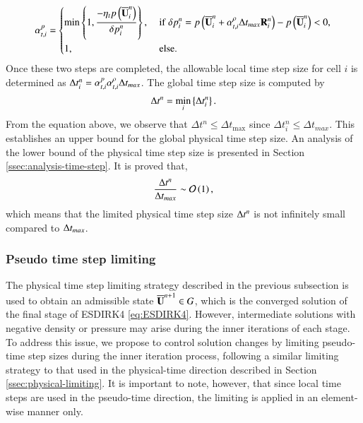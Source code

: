 \begin{equation}
\label{eq:alpha-t-p}
    \alpha_{t,i}^{p} = \begin{dcases}
        \min\left\{1, \dfrac{-\eta_t p \left(\UM^n_i\right)}{\delta p_i^n} \right\}, & \ 
        \mathrm{if} \ \delta p_i^n=  p \left(\UM^n_i + \alpha_{t,i}^{\rho} \inc t_{max} \R^n_i\right) -  p \left(\UM^n_i\right) <0, \\
        1, & \ \mathrm{else}.
    \end{dcases}
\end{equation}
Once these two steps are completed, the allowable local time step size for cell $i$ is determined as $\Delta t^n_i= \alpha_{t,i}^{p}  \alpha_{t,i}^{\rho} \mathrm\Delta t_{max}$.
The global time step size is computed by
\begin{equation}
    \label{eq:alpha-t-global}
    \mathrm\Delta t^n = \min_i \left\{\Delta t^n_i \right\}.
\end{equation}
From the equation above, we observe that $\Delta t^n \leq \Delta t_{\text{max}}$ since $\Delta t^n_i \leq \Delta t_{max}$. This establishes an upper bound for the global physical time step size.
An analysis of the lower bound of the physical time step size is presented in Section \ref{ssec:analysis-time-step}. It is proved that, 
\begin{equation}
    \dfrac{\mathrm\Delta t^n}{\mathrm\Delta t_{max}} \sim \mathcal{O} \left(1\right),
\end{equation}
which means that the limited physical time step size $\mathrm\Delta t^n$ is not infinitely small compared to $\mathrm\Delta t_{max}$.


\subsubsection{Pseudo time step limiting}
\label{ssec:pseudo-limiting}

The physical time step limiting strategy described in the previous subsection is used to obtain an admissible state $\overline{\mathbf{U}}^{n+1} \in G$, which is the converged solution of the final stage of ESDIRK4 \eqref{eq:ESDIRK4}. However, intermediate solutions with negative density or pressure may arise during the inner iterations of each stage. To address this issue, we propose to control solution changes by limiting pseudo-time step sizes during the inner iteration process, following a similar limiting strategy to that used in the physical-time direction described in Section \ref{ssec:physical-limiting}. It is important to note, however, that since local time steps are used in the pseudo-time direction, the limiting is applied in an element-wise manner only.

